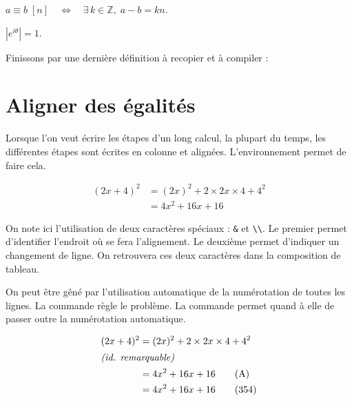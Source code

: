 \documentclass[10pt,french,openright,twoside]{book}
\begin{document}
{{\begin{SideBySideExample}
    $a \equiv b\; [n] \quad\Leftrightarrow\quad
        \exists\, k \in \mathds Z,\; a - b = kn$.\medskip
        
    $\left\lvert e^{i\theta}\right\rvert = 1$.
\end{SideBySideExample}
}\bigskip

Finissons par une dernière définition à recopier et à compiler :


\section{Aligner des égalités}

Lorsque l'on veut écrire les étapes d'un long calcul, la plupart du temps, les différentes étapes sont écrites en colonne et alignées. L'environnement  permet de faire cela.\bigskip

{\NewFont
\begin{SideBySideExample}
    \begin{align}
        (2x + 4)^2 &= (2x)^2 + 2\times 2x\times 4 + 4^2 \\
                   &= 4x^2 + 16x + 16
    \end{align}
\end{SideBySideExample}
}\bigskip

On note ici l'utilisation de deux caractères spéciaux : \verb!&! et \verb!\\!. Le premier permet d'identifier l'endroit où se fera l'alignement. Le deuxième permet d'indiquer un changement de ligne. On retrouvera ces deux caractères dans la composition de tableau.

On peut être gêné par l'utilisation automatique de la numérotation de toutes les lignes. La commande  règle le problème. La commande  permet quand à elle de passer outre la numérotation automatique.\bigskip

{\NewFont
\begin{SideBySideExample}
    \begin{align}
        (2x + 4)^2 &= (2x)^2 + 2\times 2x\times 4
                                    + 4^2 \nonumber\\
        \shortintertext{\textit{(id. remarquable)}}
                   &= 4x^2 + 16x + 16 \tag{A} \\
                   &= 4x^2 + 16x + 16 \tag{354}
    \end{align}
\end{SideBySideExample}
}\bigskip

}
\end{document}
